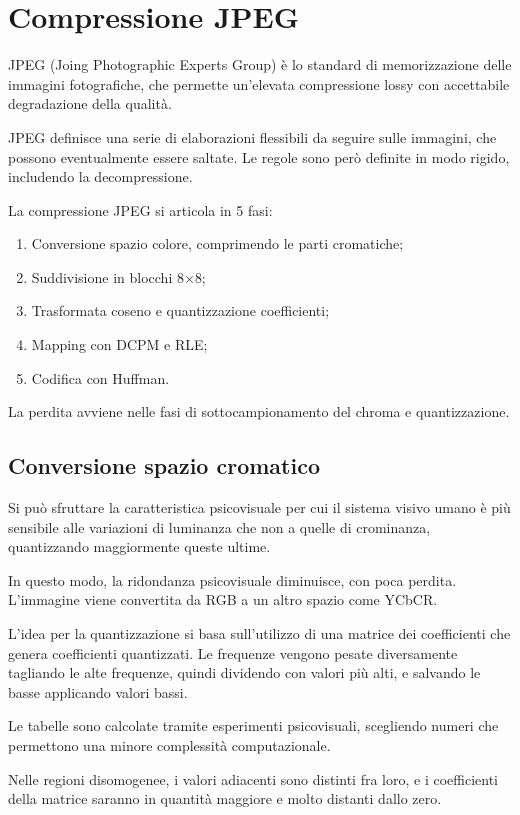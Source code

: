 \section{Compressione JPEG}
JPEG (Joing Photographic Experts Group) è lo standard di memorizzazione delle immagini fotografiche, che permette un'elevata compressione lossy con accettabile degradazione della qualità. 

JPEG definisce una serie di elaborazioni flessibili da seguire sulle immagini, che possono eventualmente essere saltate. Le regole sono però definite in modo rigido, includendo la decompressione.

La compressione JPEG si articola in 5 fasi:
\begin{enumerate}
	\item Conversione spazio colore, comprimendo le parti cromatiche;
	\item Suddivisione in blocchi 8$\times$8;
	\item Trasformata coseno e quantizzazione coefficienti;
	\item Mapping con DCPM e RLE;
	\item Codifica con Huffman.
\end{enumerate}
La perdita avviene nelle fasi di sottocampionamento del chroma e quantizzazione. 

\subsection{Conversione spazio cromatico}
Si può sfruttare la caratteristica psicovisuale per cui il sistema visivo umano è più sensibile alle variazioni di luminanza che non a quelle di crominanza, quantizzando maggiormente queste ultime.

In questo modo, la ridondanza psicovisuale diminuisce, con poca perdita. L'immagine viene convertita da RGB a un altro spazio come YCbCR. 



L'idea per la quantizzazione si basa sull'utilizzo di una matrice dei coefficienti che genera coefficienti quantizzati. Le frequenze vengono pesate diversamente tagliando le alte frequenze, quindi dividendo con valori più alti, e salvando le basse applicando valori bassi.

Le tabelle sono calcolate tramite esperimenti psicovisuali, scegliendo numeri che permettono una minore complessità computazionale. 

Nelle regioni disomogenee, i valori adiacenti sono distinti fra loro, e i coefficienti della matrice saranno in quantità maggiore e molto distanti dallo zero. 


